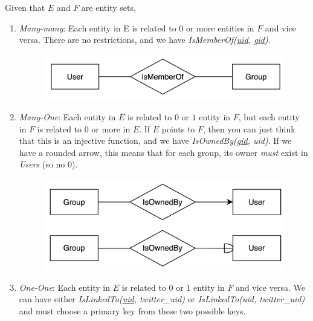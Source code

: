 \documentclass{article}
\begin{document}
      \begin{definition}
        Given that $E$ and $F$ are entity sets, 
        \begin{enumerate}
          \item \textit{Many-many}: Each entity in E is related to $0$ or more entities in $F$ and vice versa. There are no restrictions, and we have \textit{IsMemberOf(\underline{uid}, \underline{gid})}. 

          \begin{figure}[H]
            \centering 
            \includegraphics[scale=0.3]{img/ismember.png}
            \caption{} 
            \label{fig:ismember}
          \end{figure}


          \item \textit{Many-One}: Each entity in $E$ is related to $0$ or $1$ entity in $F$, but each entity in $F$ is related to $0$ or more in $E$. If $E$ points to $F$, then you can just think that this is an injective function, and we have \textit{IsOwnedBy(\underline{gid}, uid)}. If we have a rounded arrow, this means that for each group, its owner \textit{must} exist in \textit{Users} (so no $0$). 

          \begin{figure}[H]
            \centering 
            \includegraphics[scale=0.3]{img/isowned.png}
            \caption{} 
            \label{fig:isowned}
          \end{figure}


        \item \textit{One-One}: Each entity in $E$ is related to $0$ or $1$ entity in $F$ and vice versa. We can have either \textit{IsLinkedTo(\underline{uid}, twitter\_uid)} or \textit{IsLinkedTo(uid, \textit{twitter\_uid})} and must choose a primary key from these two possible keys.  


\end{enumerate}
\end{definition}
\end{document}
